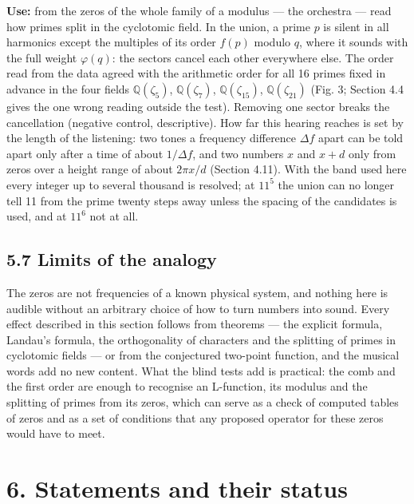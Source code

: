 \documentclass[
  10pt,
]{article}
\begin{document}
\textbf{Use:} from the zeros of the whole family of a modulus --- the
orchestra --- read how primes split in the cyclotomic field. In the
union, a prime \(p\) is silent in all harmonics except the multiples of
its order \(f(p)\) modulo \(q\), where it sounds with the full weight
\(\varphi(q)\): the sectors cancel each other everywhere else. The order
read from the data agreed with the arithmetic order for all 16 primes
fixed in advance in the four fields \(\mathbb{Q}(\zeta_5)\),
\(\mathbb{Q}(\zeta_7)\), \(\mathbb{Q}(\zeta_{15})\),
\(\mathbb{Q}(\zeta_{21})\) (Fig. 3; Section 4.4 gives the one wrong
reading outside the test). Removing one sector breaks the cancellation
(negative control, descriptive). How far this hearing reaches is set by
the length of the listening: two tones a frequency difference
\(\Delta f\) apart can be told apart only after a time of about
\(1/\Delta f\), and two numbers \(x\) and \(x + d\) only from zeros over
a height range of about \(2\pi x/d\) (Section 4.11). With the band used
here every integer up to several thousand is resolved; at \(11^5\) the
union can no longer tell 11 from the prime twenty steps away unless the
spacing of the candidates is used, and at \(11^6\) not at all.

\hypertarget{limits-of-the-analogy}{%
\subsection{5.7 Limits of the analogy}\label{limits-of-the-analogy}}

The zeros are not frequencies of a known physical system, and nothing
here is audible without an arbitrary choice of how to turn numbers into
sound. Every effect described in this section follows from theorems ---
the explicit formula, Landau's formula, the orthogonality of characters
and the splitting of primes in cyclotomic fields --- or from the
conjectured two-point function, and the musical words add no new
content. What the blind tests add is practical: the comb and the first
order are enough to recognise an L-function, its modulus and the
splitting of primes from its zeros, which can serve as a check of
computed tables of zeros and as a set of conditions that any proposed
operator for these zeros would have to meet.

\hypertarget{statements-and-their-status}{%
\section{6. Statements and their
status}\label{statements-and-their-status}}
\end{document}

